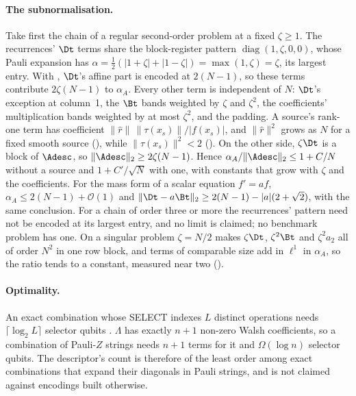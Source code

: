 \paragraph{The subnormalisation.} Take first the chain of a regular second-order problem at a fixed $\zeta\ge1$. The recurrences' $\Dt$ terms share the block-register pattern $\operatorname{diag}(1,\zeta,0,0)$, whose Pauli expansion has $\alpha=\tfrac12(|1+\zeta|+|1-\zeta|)=\max(1,\zeta)=\zeta$, its largest entry. With , $\Dt$'s affine part is encoded at $2(N-1)$, so these terms contribute $2\zeta(N-1)$ to $\alpha_A$. Every other term is independent of $N$: $\Dt$'s exception at column~1, the $\Bt$ bands weighted by $\zeta$ and $\zeta^2$, the coefficients' multiplication bands weighted by at most $\zeta^2$, and the padding. A source's rank-one term has coefficient $\|\hat r\|\,\|\tau(x_s)\|/|f(x_s)|$, and $\|\hat r\|^2$ grows as $N$ for a fixed smooth source (), while $\|\tau(x_s)\|^2<2$ (). On the other side, $\zeta\Dt$ is a block of $\Adesc$, so $\|\Adesc\|_2\ge2\zeta(N-1)$. Hence $\alpha_A/\|\Adesc\|_2\le1+C/N$ without a source and $1+C'/\sqrt N$ with one, with constants that grow with $\zeta$ and the coefficients. For the mass form of a scalar equation $f'=af$, $\alpha_A\le2(N-1)+\mathcal{O}(1)$ and $\|\Dt-a\Bt\|_2\ge2(N-1)-|a|(2+\sqrt2)$, with the same conclusion. For a chain of order three or more the recurrences' pattern need not be encoded at its largest entry, and no limit is claimed; no benchmark problem has one. On a singular problem $\zeta=N/2$ makes $\zeta\Dt$, $\zeta^2\Bt$ and $\zeta^2a_2$ all of order $N^2$ in one row block, and terms of comparable size add in $\ell^1$ in $\alpha_A$, so the ratio tends to a constant, measured near two ().

\paragraph{Optimality.} An exact combination whose SELECT indexes $L$ distinct operations needs $\lceil\log_2L\rceil$ selector qubits \cite{chakraborty2025qsvt}. $\Lambda$ has exactly $n+1$ non-zero Walsh coefficients, so a combination of Pauli-$Z$ strings needs $n+1$ terms for it and $\Omega(\log n)$ selector qubits. The descriptor's count is therefore of the least order among exact combinations that expand their diagonals in Pauli strings, and is not claimed against encodings built otherwise.


